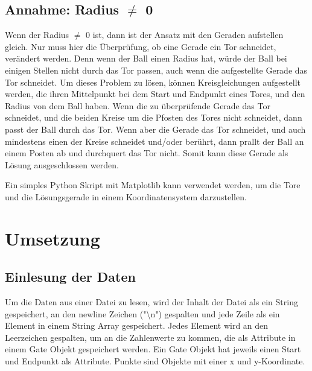 \documentclass[a4paper,10pt,ngerman]{scrartcl}
\begin{document}
\subsection{Annahme: Radius $\neq$ 0}
Wenn der Radius $\neq$ 0 ist, dann ist der Ansatz mit den Geraden aufstellen gleich. Nur muss hier die Überprüfung, ob eine Gerade ein Tor schneidet, verändert werden. Denn wenn der Ball einen Radius hat, würde der Ball bei einigen Stellen nicht durch das Tor passen, auch wenn die 
aufgestellte Gerade das Tor schneidet. Um dieses Problem zu lösen, können Kreisgleichungen aufgestellt werden, die ihren Mittelpunkt bei dem Start und Endpunkt eines Tores, und den Radius von dem Ball haben. Wenn die zu überprüfende Gerade das Tor schneidet, und die beiden Kreise 
um die Pfosten des Tores nicht schneidet, dann passt der Ball durch das Tor. Wenn aber die Gerade das Tor schneidet, und auch mindestens einen der Kreise schneidet und/oder berührt, dann prallt der Ball an einem Posten ab und durchquert das Tor nicht. Somit kann diese Gerade als Lösung 
ausgeschlossen werden.
\newline

Ein simples Python Skript mit Matplotlib kann verwendet werden, um die Tore und die Lösungsgerade in einem Koordinatensystem darzustellen.

\section{Umsetzung}

\subsection{Einlesung der Daten}
Um die Daten aus einer Datei zu lesen, wird der Inhalt der Datei als ein String gespeichert, an den newline Zeichen ("\textbackslash n") gespalten und jede Zeile als ein Element in einem String Array gespeichert. Jedes Element wird an den Leerzeichen gespalten, um an die Zahlenwerte zu kommen, die als Attribute in einem 
Gate Objekt gespeichert werden. Ein Gate Objekt hat jeweils einen Start und Endpunkt als Attribute. Punkte sind Objekte mit einer x und y-Koordinate. 
\end{document}
